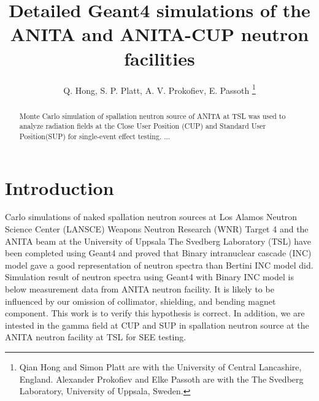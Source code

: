 \documentclass[11pt,a4paper]{IEEEtran}
\begin{document}
\title{
    Detailed Geant4 simulations of the ANITA and ANITA-CUP neutron facilities
}

\author{%
    Q. Hong,
    S. P. Platt,
    A. V. Prokofiev,
    E. Passoth
    \thanks{%
        Qian Hong and Simon Platt are with the University of Central Lancashire, England. Alexander Prokofiev and Elke Passoth are with the The Svedberg Laboratory, University of Uppsala, Sweden.
    }
}

\maketitle

\begin{abstract}
    Monte Carlo simulation of spallation neutron source of ANITA at TSL was used to analyze radiation fields at the Close User Position (CUP) and Standard User Position(SUP) for single-event effect testing. ...
\end{abstract}

\section{Introduction}
 Carlo simulations of naked spallation neutron sources at Los Alamos Neutron Science Center (LANSCE) Weapons Neutron Research (WNR) Target 4\cite{Wender87} and the ANITA beam at the University of Uppsala The Svedberg Laboratory (TSL) have been completed using Geant4 and proved that Binary intranuclear cascade (INC) model gave a good representation of neutron spectra than Bertini INC model did\cite{Platt13}. Simulation result of neutron spectra using Geant4 with Binary INC model is below measurement data from ANITA neutron facility. It is likely to be influenced by our omission of collimator, shielding, and bending magnet component. This work is to verify this hypothesis is correct. In addition, we are intested in the gamma field at CUP and SUP in spallation neutron source at the ANITA neutron facility at TSL for SEE testing.
\end{document}

